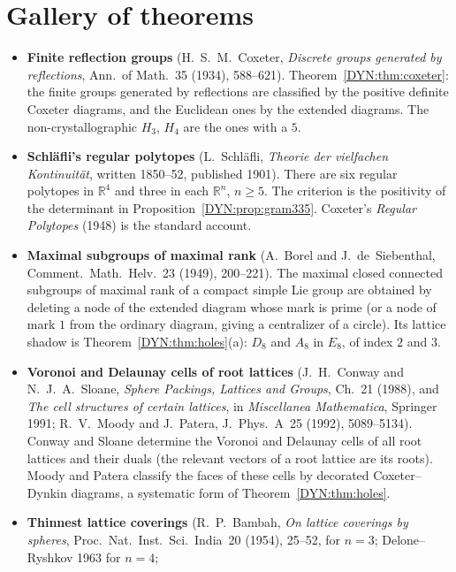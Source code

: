 \documentclass[11pt,openany]{book}
\theoremstyle{plain}
\theoremstyle{definition}
\theoremstyle{remark}
\newcommand{\R}{\mathbb{R}}
\begin{document}
\section{Gallery of theorems}
\label{DYN:sec:gallery}

\begin{itemize}[leftmargin=1.2em,itemsep=0.45em]
\item \textbf{Finite reflection groups} (H.~S.~M.~Coxeter, \emph{Discrete groups generated by reflections},
  Ann.\ of Math.~35 (1934), 588--621). Theorem~\ref{DYN:thm:coxeter}: the finite groups generated by
  reflections are classified by the positive definite Coxeter diagrams, and the Euclidean ones by the
  extended diagrams. The non-crystallographic $H_3$, $H_4$ are the ones with a $5$.
\item \textbf{Schl\"afli's regular polytopes} (L.~Schl\"afli, \emph{Theorie der vielfachen Kontinuit\"at},
  written 1850--52, published 1901). There are six regular polytopes in $\R^4$ and three in each
  $\R^n$, $n\ge5$. The criterion is the positivity of the determinant in
  Proposition~\ref{DYN:prop:gram335}. Coxeter's \emph{Regular Polytopes} (1948) is the standard account.
\item \textbf{Maximal subgroups of maximal rank} (A.~Borel and J.~de~Siebenthal, Comment.\ Math.\ Helv.~23
  (1949), 200--221). The maximal closed connected subgroups of maximal rank of a compact simple Lie group
  are obtained by deleting a node of the extended diagram whose mark is prime (or a node of mark $1$ from the
  ordinary diagram, giving a centralizer of a circle). Its lattice shadow is Theorem~\ref{DYN:thm:holes}(a):
  $D_8$ and $A_8$ in $E_8$, of index $2$ and $3$.
\item \textbf{Voronoi and Delaunay cells of root lattices} (J.~H.~Conway and N.~J.~A.~Sloane, \emph{Sphere
  Packings, Lattices and Groups}, Ch.~21 (1988), and \emph{The cell structures of certain lattices}, in
  \emph{Miscellanea Mathematica}, Springer 1991; R.~V.~Moody and J.~Patera, J.\ Phys.~A~25 (1992),
  5089--5134). Conway and Sloane determine the Voronoi and Delaunay cells of all root lattices and their
  duals (the relevant vectors of a root lattice are its roots). Moody and Patera classify the faces of
  these cells by decorated Coxeter--Dynkin diagrams, a systematic form of Theorem~\ref{DYN:thm:holes}.
\item \textbf{Thinnest lattice coverings} (R.~P.~Bambah, \emph{On lattice coverings by spheres}, Proc.\
  Nat.\ Inst.\ Sci.\ India~20 (1954), 25--52, for $n=3$; Delone--Ryshkov 1963 for $n=4$;

\end{itemize}
\end{document}
